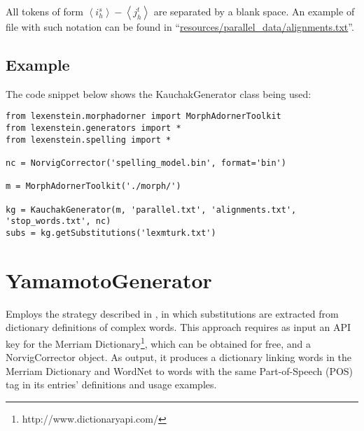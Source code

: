 All tokens of form $\left \langle i_{h}^{s} \right \rangle\! -\! \left \langle j_{h}^{t} \right \rangle$ are separated by a blank space. An example of file with such notation can be found in ``\url{resources/parallel_data/alignments.txt}''.

\subsection{Example}

The code snippet below shows the KauchakGenerator class being used:

\begin{lstlisting}
from lexenstein.morphadorner import MorphAdornerToolkit
from lexenstein.generators import *
from lexenstein.spelling import *

nc = NorvigCorrector('spelling_model.bin', format='bin')

m = MorphAdornerToolkit('./morph/')

kg = KauchakGenerator(m, 'parallel.txt', 'alignments.txt', 'stop_words.txt', nc)
subs = kg.getSubstitutions('lexmturk.txt')
\end{lstlisting}

































\section{YamamotoGenerator}

Employs the strategy described in \cite{Yamamoto2013}, in which substitutions are extracted from dictionary definitions of complex words. This approach requires as input an API key for the Merriam Dictionary\footnote{http://www.dictionaryapi.com/}, which can be obtained for free, and a NorvigCorrector object. As output, it produces a dictionary linking words in the Merriam Dictionary and WordNet to words with the same Part-of-Speech (POS) tag in its entries' definitions and usage examples.

